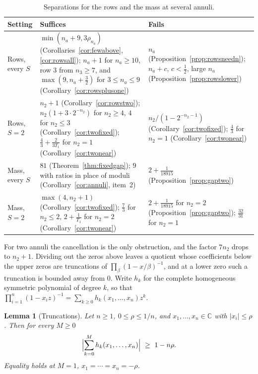\documentclass[11pt]{article}
\newtheorem{lemma}[theorem]{Lemma}
\begin{document}
\begin{table}[tp]
\centering
\small
\renewcommand{\arraystretch}{1.2}
\begin{tabular}{@{}p{}p{}p{}@{}}
\hline
Setting & Suffices & Fails\\
\hline
Rows, every $S$ & $\min(n_a+9,3\rho_{n_a})$
  (Corollaries~\ref{cor:fewabove}, \ref{cor:rowsall});
  $n_a+1$ for $n_a\ge10$, row $3$ from $n_3\ge7$, and $\max(9,n_a+\frac32)$
  for $3\le n_a\le9$ (Corollary~\ref{cor:rowsplusone})
  & $n_a$ (Proposition~\ref{prop:rowsneedn});
  $n_a+c$, $c<\frac12$, large $n_a$ (Proposition~\ref{prop:rowslower})\\
Rows, $S=2$ & $n_2+1$ (Corollary~\ref{cor:rowstwo});
  $n_2(1+3\cdot2^{-n_2})$ for $n_2\ge4$, $4$ for $n_2\le3$
  (Corollary~\ref{cor:twofixed}); $\frac43+\frac2{3T_1}$ for $n_2=1$
  (Corollary~\ref{cor:twonear})
  & \raggedright $n_2/(1-2^{-n_2-1})$ (Corollary~\ref{cor:twofixed});
  $\frac43$ for $n_2=1$ (Corollary~\ref{cor:twonear})\tabularnewline
Mass, every $S$ & $81$ (Theorem~\ref{thm:fixedgap}); $9$ with ratios in
  place of moduli (Corollary~\ref{cor:annuli}, item~2)
  & $2+\frac1{18915}$ (Proposition~\ref{prop:gaptwo})\\
Mass, $S=2$ & $\max(4,n_2+1)$ (Corollary~\ref{cor:twofixed});
  $\frac73$ for $n_2\le2$, $2+\frac1{T_1}$ for $n_2=2$
  (Corollary~\ref{cor:twonear})
  & $2+\frac1{18915}$ for $n_2=2$ (Proposition~\ref{prop:gaptwo});
  $\frac{32}{31}$ for $n_2=1$\\
\hline
\end{tabular}
\caption{Separations for the rows and the mass at several annuli.}\label{tab:sep}
\end{table}

For two annuli the cancellation is the only obstruction, and the factor
$7n_2$ drops to $n_2+1$.  Dividing out the zeros above leaves a quotient
whose coefficients below the upper zeros are truncations of
$\prod_\beta(1-x/\beta)^{-1}$, and at a lower zero such a truncation is
bounded away from $0$.  Write $h_k$ for the complete homogeneous symmetric
polynomial of degree $k$, so that
$\prod_{i=1}^n(1-x_iz)^{-1}=\sum_{k\ge0}h_k(x_1,\ldots,x_n)z^k$.

\begin{lemma}[Truncations]\label{lem:trunc}
Let $n\ge1$, $0\le\rho\le1/n$, and $x_1,\ldots,x_n\in\mathbb C$ with
$|x_i|\le\rho$.  Then for every $M\ge0$
\[
  \Bigl|\sum_{k=0}^Mh_k(x_1,\ldots,x_n)\Bigr|\ \ge\ 1-n\rho .
\]
Equality holds at $M=1$, $x_1=\cdots=x_n=-\rho$.
\end{lemma}
\end{document}
